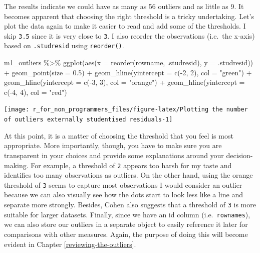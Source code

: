 \documentclass[
]{book}
\newenvironment{Shaded}{\begin{snugshade}}{\end{snugshade}}
\newcommand{\AttributeTok}[1]{\textcolor[rgb]{0.77,0.63,0.00}{#1}}
\newcommand{\DecValTok}[1]{\textcolor[rgb]{0.00,0.00,0.81}{#1}}
\newcommand{\FloatTok}[1]{\textcolor[rgb]{0.00,0.00,0.81}{#1}}
\newcommand{\FunctionTok}[1]{\textcolor[rgb]{0.00,0.00,0.00}{#1}}
\newcommand{\NormalTok}[1]{#1}
\newcommand{\SpecialCharTok}[1]{\textcolor[rgb]{0.00,0.00,0.00}{#1}}
\newcommand{\StringTok}[1]{\textcolor[rgb]{0.31,0.60,0.02}{#1}}
\begin{document}
The results indicate we could have as many as 56 outliers and as little as 9. It becomes apparent that choosing the right threshold is a tricky undertaking. Let's plot the data again to make it easier to read and add some of the thresholds. I skip \texttt{3.5} since it is very close to \texttt{3}. I also reorder the observations (i.e.~the x-axis) based on \texttt{.studresid} using \texttt{reorder()}.

\begin{Shaded}
\begin{Highlighting}[]
\NormalTok{m1\_outliers }\SpecialCharTok{\%\textgreater{}\%}
  \FunctionTok{ggplot}\NormalTok{(}\FunctionTok{aes}\NormalTok{(}\AttributeTok{x =} \FunctionTok{reorder}\NormalTok{(rowname, .studresid),}
             \AttributeTok{y =}\NormalTok{ .studresid)) }\SpecialCharTok{+}
  \FunctionTok{geom\_point}\NormalTok{(}\AttributeTok{size =} \FloatTok{0.5}\NormalTok{) }\SpecialCharTok{+}
  \FunctionTok{geom\_hline}\NormalTok{(}\AttributeTok{yintercept =} \FunctionTok{c}\NormalTok{(}\SpecialCharTok{{-}}\DecValTok{2}\NormalTok{, }\DecValTok{2}\NormalTok{), }\AttributeTok{col =} \StringTok{"green"}\NormalTok{) }\SpecialCharTok{+}
  \FunctionTok{geom\_hline}\NormalTok{(}\AttributeTok{yintercept =} \FunctionTok{c}\NormalTok{(}\SpecialCharTok{{-}}\DecValTok{3}\NormalTok{, }\DecValTok{3}\NormalTok{), }\AttributeTok{col =} \StringTok{"orange"}\NormalTok{) }\SpecialCharTok{+}
    \FunctionTok{geom\_hline}\NormalTok{(}\AttributeTok{yintercept =} \FunctionTok{c}\NormalTok{(}\SpecialCharTok{{-}}\DecValTok{4}\NormalTok{, }\DecValTok{4}\NormalTok{), }\AttributeTok{col =} \StringTok{"red"}\NormalTok{)}
\end{Highlighting}
\end{Shaded}

\begin{center}\texttt{[image: r\_for\_non\_programmers\_files/figure-latex/Plotting the number of outliers externally studentised residuals-1]} \end{center}

At this point, it is a matter of choosing the threshold that you feel is most appropriate. More importantly, though, you have to make sure you are transparent in your choices and provide some explanations around your decision-making. For example, a threshold of \texttt{2} appears too harsh for my taste and identifies too many observations as outliers. On the other hand, using the orange threshold of \texttt{3} seems to capture most observations I would consider an outlier because we can also visually see how the dots start to look less like a line and separate more strongly. Besides, Cohen also suggests that a threshold of \texttt{3} is more suitable for larger datasets. Finally, since we have an id column (i.e.~\texttt{rownames}), we can also store our outliers in a separate object to easily reference it later for comparisons with other measures. Again, the purpose of doing this will become evident in Chapter \ref{reviewing-the-outliers}.
\end{document}
